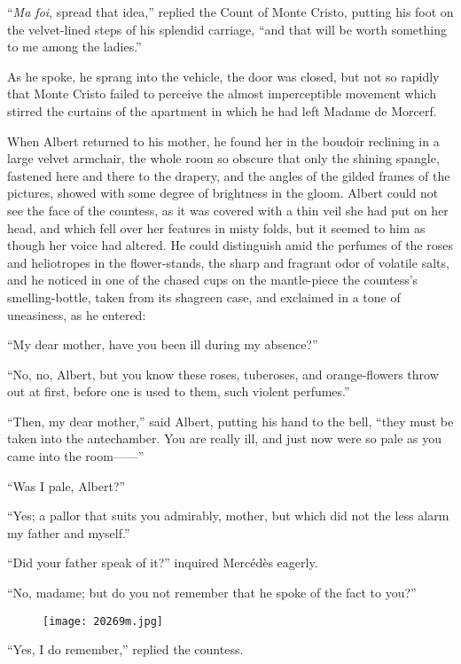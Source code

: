 “\textit{Ma foi}, spread that idea,” replied the Count of Monte Cristo,
putting his foot on the velvet-lined steps of his splendid carriage,
“and that will be worth something to me among the ladies.”

As he spoke, he sprang into the vehicle, the door was closed, but not
so rapidly that Monte Cristo failed to perceive the almost
imperceptible movement which stirred the curtains of the apartment in
which he had left Madame de Morcerf.

When Albert returned to his mother, he found her in the boudoir
reclining in a large velvet armchair, the whole room so obscure that
only the shining spangle, fastened here and there to the drapery, and
the angles of the gilded frames of the pictures, showed with some
degree of brightness in the gloom. Albert could not see the face of the
countess, as it was covered with a thin veil she had put on her head,
and which fell over her features in misty folds, but it seemed to him
as though her voice had altered. He could distinguish amid the perfumes
of the roses and heliotropes in the flower-stands, the sharp and
fragrant odor of volatile salts, and he noticed in one of the chased
cups on the mantle-piece the countess’s smelling-bottle, taken from its
shagreen case, and exclaimed in a tone of uneasiness, as he entered:

“My dear mother, have you been ill during my absence?”

“No, no, Albert, but you know these roses, tuberoses, and
orange-flowers throw out at first, before one is used to them, such
violent perfumes.”

“Then, my dear mother,” said Albert, putting his hand to the bell,
“they must be taken into the antechamber. You are really ill, and just
now were so pale as you came into the room——”

“Was I pale, Albert?”

“Yes; a pallor that suits you admirably, mother, but which did not the
less alarm my father and myself.”

“Did your father speak of it?” inquired Mercédès eagerly.

“No, madame; but do you not remember that he spoke of the fact to you?”

\begin{figure}[ht]
\texttt{[image: 20269m.jpg]}
\end{figure}

“Yes, I do remember,” replied the countess.

